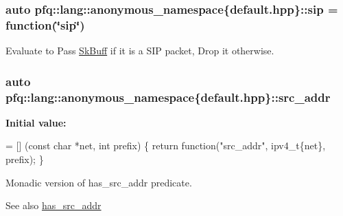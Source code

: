 \subsubsection[{\texorpdfstring{sip}{sip}}]{\setlength{\rightskip}{0pt plus 5cm}auto pfq\+::lang\+::anonymous\+\_\+namespace\{default.\+hpp\}\+::sip = {\bf function}(\char`\"{}sip\char`\"{})}\hypertarget{namespacepfq_1_1lang_1_1anonymous__namespace_02default_8hpp_03_a3ac0338626e771b43b200663e095aa36}{}\label{namespacepfq_1_1lang_1_1anonymous__namespace_02default_8hpp_03_a3ac0338626e771b43b200663e095aa36}


Evaluate to {\ttfamily Pass} \hyperlink{structpfq_1_1lang_1_1SkBuff}{Sk\+Buff} if it is a S\+IP packet, {\ttfamily Drop} it otherwise. 

\subsubsection[{\texorpdfstring{src\+\_\+addr}{src_addr}}]{\setlength{\rightskip}{0pt plus 5cm}auto pfq\+::lang\+::anonymous\+\_\+namespace\{default.\+hpp\}\+::src\+\_\+addr}\hypertarget{namespacepfq_1_1lang_1_1anonymous__namespace_02default_8hpp_03_a2ee09b5a65a64d60bc797b2ecd1c8a4a}{}\label{namespacepfq_1_1lang_1_1anonymous__namespace_02default_8hpp_03_a2ee09b5a65a64d60bc797b2ecd1c8a4a}
{\bfseries Initial value\+:}
\begin{DoxyCode}
= [] (\textcolor{keyword}{const} \textcolor{keywordtype}{char} *net, \textcolor{keywordtype}{int} prefix)
        \{
            \textcolor{keywordflow}{return} \textcolor{keyword}{function}(\textcolor{stringliteral}{"src\_addr"}, ipv4\_t\{net\}, prefix);
        \}
\end{DoxyCode}


Monadic version of {\ttfamily has\+\_\+src\+\_\+addr} predicate. 

\begin{DoxySeeAlso}{See also}
\hyperlink{namespacepfq_1_1lang_1_1anonymous__namespace_02default_8hpp_03_acb03dd3e34d6dd7e83d621fa9077194c}{has\+\_\+src\+\_\+addr} 
\end{DoxySeeAlso}
